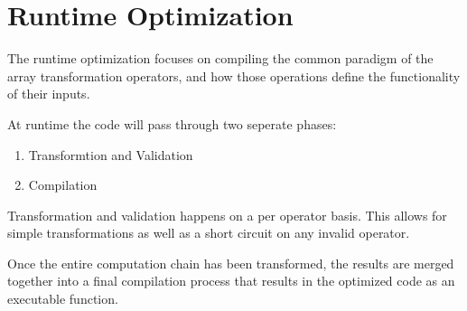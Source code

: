 \section{Runtime Optimization}
The runtime optimization focuses on compiling the common paradigm of the array transformation operators, and how those operations define the functionality of their inputs.

At runtime the code will pass through two seperate phases:

\begin{enumerate}
  \item Transformtion and Validation
  \item Compilation
\end{enumerate}

Transformation and validation happens on a per operator basis.  This allows for simple transformations as well as a short circuit on any invalid operator.

Once the entire computation chain has been transformed, the results are merged together into a final compilation process that results in the optimized code as an executable function. 

\begin{minipage}{\linewidth}

\end{minipage}


